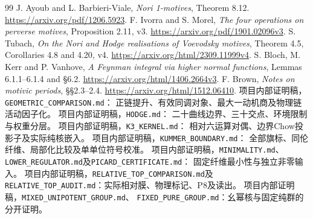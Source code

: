 \documentclass[11pt,a4paper]{ctexart}
\theoremstyle{cnplain}\newtheorem{theorem}{定理}[section]
\theoremstyle{remark}\newtheorem{remark}[theorem]{注}
\begin{document}
\begin{thebibliography}{99}
 J. Ayoub and L. Barbieri-Viale,
\emph{Nori 1-motives}, Theorem 8.12.
\url{https://arxiv.org/pdf/1206.5923}.
 F. Ivorra and S. Morel,
\emph{The four operations on perverse motives}, Proposition 2.11, v3.
\url{https://arxiv.org/pdf/1901.02096v3}.
 S. Tubach,
\emph{On the Nori and Hodge realisations of Voevodsky motives},
Theorem 4.5, Corollaries 4.8 and 4.20, v4.
\url{https://arxiv.org/html/2309.11999v4}.
 S. Bloch, M. Kerr and P. Vanhove,
\emph{A Feynman integral via higher normal functions},
Lemmas 6.1.1--6.1.4 and \S6.2.
\url{https://arxiv.org/html/1406.2664v3}.
 F. Brown, \emph{Notes on motivic periods}, \S\S2.3--2.4.
\url{https://arxiv.org/html/1512.06410}.
 项目内部证明稿，\texttt{GEOMETRIC\_COMPARISON.md}：
正链提升、有效同调对象、最大一动机商及物理链活动因子化。
 项目内部证明稿，\texttt{HODGE.md}：
二十曲线边界、三十交点、环境限制与权重分层。
 项目内部证明稿，\texttt{K3\_KERNEL.md}：
相对六运算对偶、边界Chow投影子及实际纯核嵌入。
 项目内部证明稿，\texttt{KUMMER\_BOUNDARY.md}：
全部旗标、同伦纤维、局部化比较及单单位符号校准。
 项目内部证明稿，\texttt{MINIMALITY.md}、
\texttt{LOWER\_REGULATOR.md}及\texttt{PICARD\_CERTIFICATE.md}：
固定纤维最小性与独立非零输入。
 项目内部证明稿，\texttt{RELATIVE\_TOP\_COMPARISON.md}及
\texttt{RELATIVE\_TOP\_AUDIT.md}：实际相对膜、物理标记、P8及读出。
 项目内部证明稿，\texttt{MIXED\_UNIPOTENT\_GROUP.md}、
\texttt{FIXED\_PURE\_GROUP.md}：幺幂核与固定纯群的分开证明。
\end{thebibliography}
\end{document}
